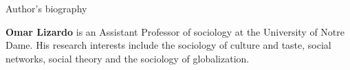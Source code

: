 \newpage
\singlespacing
\begin{center}
	{\large Author's biography}
\end{center}

{\bf Omar Lizardo} is an Assistant Professor of sociology at the University of Notre Dame.  His research interests include the sociology of culture and taste, social networks, social theory and the sociology of globalization.